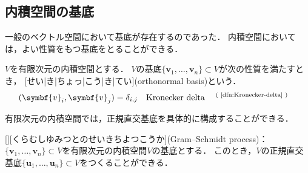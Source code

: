 \documentclass[../sotsu.tex]{subfiles}
\begin{document}
\subsection{内積空間の基底}

一般のベクトル空間において基底が存在するのであった．
内積空間においては，よい性質をもつ基底をとることができる．

\begin{definition}[正規直交基底]
    $V$を有限次元の内積空間とする．
    $V$の基底$ \{ \symbf{v}_1, \dots, \symbf{v}_n \} \subset V$が次の性質を満たすとき，
    [せい|き|ちょっ|こう|き|てい](orthonormal basis)という．
    \begin{equation*}
        (\symbf{v}_i, \symbf{v}_j) = \delta_{i,j} 
            \quad \text{Kronecker delta\refdfn{dfn:Kronecker-delta}}
    \end{equation*}
\end{definition}

有限次元の内積空間では，正規直交基底を具体的に構成することができる．

\begin{theorem}
    [][くらむしゆみつとのせいきちよつこうか](Gram–Schmidt process)：
    $ \{ \symbf{v}_1, \dots, \symbf{v}_n \} \subset V$を有限次元の内積空間$V$の基底とする．
    このとき，$V$の正規直交基底$ \{ \symbf{u}_1, \dots, \symbf{u}_n \} \subset V$をつくることができる．
\end{theorem}
\end{document}
